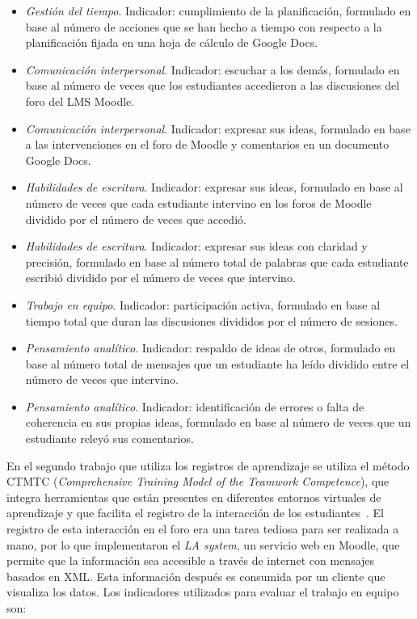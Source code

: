 \begin{itemize}
\item \emph{Gestión del tiempo}. Indicador: cumplimiento de la planificación, formulado en base al número de acciones que se han hecho a tiempo con respecto a la planificación fijada en una hoja de cálculo de Google Docs.
\item \emph{Comunicación interpersonal}. Indicador: escuchar a los demás, formulado en base al número de veces que los estudiantes accedieron a las discusiones del foro del LMS Moodle.
\item \emph{Comunicación interpersonal}. Indicador: expresar sus ideas, formulado en base a las intervenciones en el foro de Moodle y comentarios en un documento Google Docs.
\item \emph{Habilidades de escritura}. Indicador: expresar sus ideas, formulado en base al número de veces que cada estudiante intervino en los foros de Moodle dividido por el número de veces que accedió.
\item \emph{Habilidades de escritura}. Indicador: expresar sus ideas con claridad y precisión, formulado en base al número total de palabras que cada estudiante escribió dividido por el número de veces que intervino.
\item \emph{Trabajo en equipo}. Indicador: participación activa, formulado en base al tiempo total que duran las discusiones divididos por el número de sesiones.
\item \emph{Pensamiento analítico}. Indicador: respaldo de ideas de otros, formulado en base al número total de mensajes que un estudiante ha leído dividido entre el número de veces que intervino.
\item \emph{Pensamiento analítico}. Indicador: identificación de errores o falta de coherencia en sus propias ideas, formulado en base al número de veces que un estudiante releyó sus comentarios.
\end{itemize}

En el segundo trabajo que utiliza los registros de aprendizaje se utiliza el método CTMTC (\emph{Comprehensive Training Model of the Teamwork Competence}), que integra herramientas que están presentes en diferentes entornos virtuales de aprendizaje y que facilita el registro de la interacción de los estudiantes~\cite{fidalgo:2015}. El registro de esta interacción en el foro era una tarea tediosa para ser realizada a mano, por lo que implementaron el \emph{LA system}, un servicio web en Moodle, que permite que la información sea accesible a través de internet con mensajes basados en XML. Esta información después es consumida por un cliente que visualiza los datos. Los indicadores utilizados para evaluar el trabajo en equipo son: 

